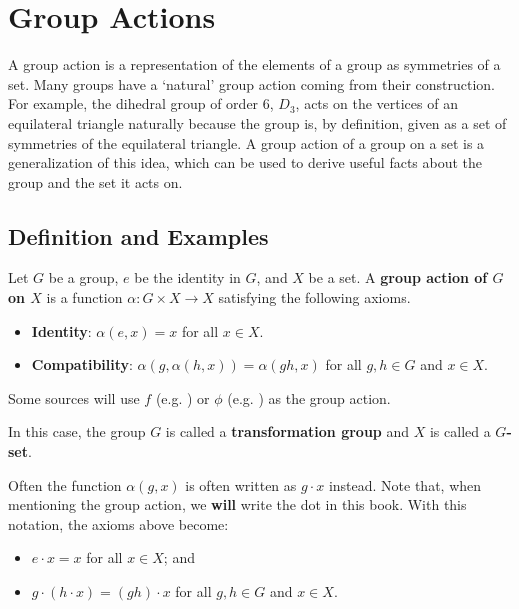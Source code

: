 \chapter{Group Actions}
A group action is a representation of the elements of a group as symmetries of a set. Many groups have a `natural' group action coming from their construction. For example, the dihedral group of order 6, $D_3$, acts on the vertices of an equilateral triangle naturally because the group is, by definition, given as a set of symmetries of the equilateral triangle. A group action of a group on a set is a generalization of this idea, which can be used to derive useful facts about the group and the set it acts on.

\section{Definition and Examples}
\begin{definition}\label{definition-group-action}
    Let $G$ be a group, $e$ be the identity in $G$, and $X$ be a set. A \textbf{group action of $G$ on $X$} is a function $\alpha: G \times X \to X$ satisfying the following axioms.
    \begin{itemize}
        \item \textbf{Identity}: $\alpha(e, x) = x$ for all $x \in X$.
        \item \textbf{Compatibility}: $\alpha(g, \alpha(h, x)) = \alpha(gh, x)$ for all $g, h \in G$ and $x \in X$.
    \end{itemize}
\end{definition}
\begin{remark}
    Some sources will use $f$ (e.g. \cite{brilliant_groupactions}) or $\phi$ (e.g. \cite{rowland_groupaction}) as the group action.
\end{remark}
In this case, the group $G$ is called a \textbf{transformation group} and $X$ is called a \textbf{$G$-set}.

\newpage

Often the function $\alpha(g, x)$ is often written as $g \cdot x$ instead. Note that, when mentioning the group action, we \textbf{will} write the dot in this book. With this notation, the axioms above become:
\begin{itemize}
    \item $e \cdot x = x$ for all $x \in X$; and
    \item $g \cdot (h \cdot x) = (gh) \cdot x$ for all $g, h \in G$ and $x \in X$.
\end{itemize}

